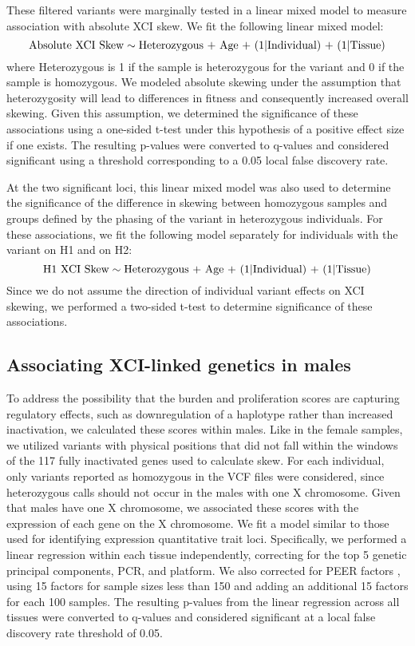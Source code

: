 These filtered variants were marginally tested in a linear mixed model to measure association with absolute XCI skew. We fit the following linear mixed model:
\begin{equation}
\text{Absolute XCI Skew} \sim \text{Heterozygous + Age + (1\textbar Individual) + (1\textbar Tissue)}
\end{equation}
where Heterozygous is 1 if the sample is heterozygous for the variant and 0 if the sample is homozygous. We modeled absolute skewing under the assumption that heterozygosity will lead to differences in fitness and consequently increased overall skewing. Given this assumption, we determined the significance of these associations using a one-sided t-test under this hypothesis of a positive effect size if one exists. The resulting p-values were converted to q-values \cite{Storey2003-kx} and considered significant using a threshold corresponding to a 0.05 local false discovery rate.

At the two significant loci, this linear mixed model was also used to determine the significance of the difference in skewing between homozygous samples and groups defined by the phasing of the variant in heterozygous individuals. For these associations, we fit the following model separately for individuals with the variant on H1 and on H2:
\begin{equation}
\text{H1 XCI Skew} \sim \text{Heterozygous + Age + (1\textbar Individual) + (1\textbar Tissue)}
\end{equation}
Since we do not assume the direction of individual variant effects on XCI skewing, we performed a two-sided t-test to determine significance of these associations. 

\subsection{Associating XCI-linked genetics in males}

To address the possibility that the burden and proliferation scores are capturing regulatory effects, such as downregulation of a haplotype rather than increased inactivation, we calculated these scores within males. Like in the female samples, we utilized variants with physical positions that did not fall within the windows of the 117 fully inactivated genes used to calculate skew.  For each individual, only variants reported as homozygous in the VCF files were considered, since heterozygous calls should not occur in the males with one X chromosome. Given that males have one X chromosome, we associated these scores with the expression of each gene on the X chromosome. We fit a model similar to those used for identifying expression quantitative trait loci. Specifically, we performed a linear regression within each tissue independently, correcting for the top 5 genetic principal components, PCR, and platform. We also corrected for PEER factors \cite{Stegle2012-uf}, using 15 factors for sample sizes less than 150 and adding an additional 15 factors for each 100 samples. The resulting p-values from the linear regression across all tissues were converted to q-values and considered significant at a local false discovery rate threshold of 0.05. 


